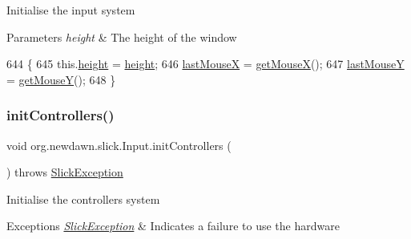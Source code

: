 Initialise the input system


\begin{DoxyParams}{Parameters}
{\em height} & The height of the window \\
\hline
\end{DoxyParams}

\begin{DoxyCode}
644                           \{
645         this.\mbox{\hyperlink{classorg_1_1newdawn_1_1slick_1_1_input_a7d805ec6ad6944a4c48189e8435c3589}{height}} = \mbox{\hyperlink{classorg_1_1newdawn_1_1slick_1_1_input_a7d805ec6ad6944a4c48189e8435c3589}{height}};
646         \mbox{\hyperlink{classorg_1_1newdawn_1_1slick_1_1_input_af21796aa14b2b0b5f799c2fa38b3c1ee}{lastMouseX}} = \mbox{\hyperlink{classorg_1_1newdawn_1_1slick_1_1_input_a59e2e96e215f9b8510ca42afec448c5e}{getMouseX}}();
647         \mbox{\hyperlink{classorg_1_1newdawn_1_1slick_1_1_input_ae2b5953abef8e76cadf0d6004c323b20}{lastMouseY}} = \mbox{\hyperlink{classorg_1_1newdawn_1_1slick_1_1_input_abf405c2d30fa7ede5a8d8619c6737a76}{getMouseY}}();
648     \}
\end{DoxyCode}
\mbox{\label{classorg_1_1newdawn_1_1slick_1_1_input_ab570b66f776cd2148c7ccf026dfd9b08}} 
\subsubsection{\texorpdfstring{init\+Controllers()}{initControllers()}}
{\footnotesize\ttfamily void org.\+newdawn.\+slick.\+Input.\+init\+Controllers (\begin{DoxyParamCaption}{ }\end{DoxyParamCaption}) throws \mbox{\hyperlink{classorg_1_1newdawn_1_1slick_1_1_slick_exception}{Slick\+Exception}}\hspace{0.3cm}{\ttfamily [inline]}}

Initialise the controllers system


\begin{DoxyExceptions}{Exceptions}
{\em \mbox{\hyperlink{classorg_1_1newdawn_1_1slick_1_1_slick_exception}{Slick\+Exception}}} & Indicates a failure to use the hardware \\
\hline
\end{DoxyExceptions}

